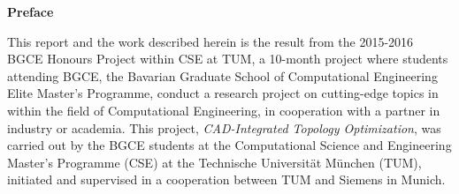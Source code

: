 \clearemptydoublepage
{}
{}	


\vspace*{3cm}

\begin{flushleft}
{\Large \bf Preface}
\end{flushleft}

\vspace{1cm}
This report and the work described herein is the result from the 2015-2016 BGCE Honours Project within CSE at TUM, a 10-month project where students attending BGCE, the Bavarian Graduate School of Computational Engineering Elite Master's Programme, conduct a research project on cutting-edge topics in within the field of Computational Engineering, in cooperation with a partner in industry or academia. This project, \emph{CAD-Integrated Topology Optimization}, was carried out by the BGCE students at the Computational Science and Engineering Master's Programme (CSE) at the Technische Universit\"at M\"unchen (TUM), initiated and supervised in a cooperation between TUM and Siemens in Munich.


\newpage
